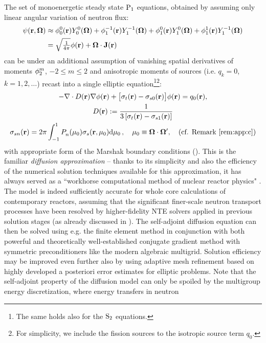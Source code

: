 The set of monoenergetic steady state $\PN[1]$ equations, obtained by assuming only linear angular variation of neutron
flux:
$$
\begin{aligned}
	\psi(\br,\bomega) &\approx \angmom{0}{0}(\br)\Y{0}{0}(\bomega) + \angmom{1}{-1}(\br)\Y{1}{-1}(\bomega)
	+ \angmom{1}{0}(\br)\Y{1}{0}(\bomega) + \angmom{1}{1}(\br)\Y{1}{-1}(\bomega)\\
	&= \sqrt{\tfrac{1}{4\pi}}\phi(\br) + \bomega\cdot \bJ(\br)
\end{aligned}
$$
can be under an additional assumption of vanishing spatial derivatives of moments $\angmom{2}{m}$, $-2 \leq m \leq
2$ and anisotropic moments of sources (i.e. $q_{k} = 0$, $k = 1,2,\ldots$)  
recast into a single elliptic equation\footnote{The same holds also for the $\SN[2]$ equations.}\footnote{For
simplicity, we include the fission sources to the isotropic source term $q_0$.}:
$$
\begin{gathered}
	-\nabla\cdot D(\br) \nabla\phi(\br) + \bigl[\sigma_t(\br) - \sigma_{s0}(\br)\bigr]\phi(\br) = q_0(\br),\\
	D(\br) := \frac{1}{3\left[\sigma_t(\br) - \sigma_{s1}(\br)\right]}\\
	\sigma_{sn}(\br) = 2\pi \muint[_0]{\P{n}{}(\mu_0)\sigma_s(\br,\mu_0)},\quad \mu_0 \equiv \bomega\cdot\bomega',\quad
	\mbox{(cf.
	Remark
	\ref{rem:app:c})}
\end{gathered}	
$$
with appropriate form of the Marshak boundary conditions (\cite{Stacey1,Reuss1}).
This is the familiar \textit{diffusion approximation} -- thanks to its simplicity and also the efficiency of the 
numerical solution techniques available for this approximation, it has always served as a ``workhorse computational 
method of nuclear reactor physics" \cite[p. 43]{Stacey1}. The model is indeed sufficiently accurate for whole core 
calculations of contemporary reactors, assuming that the significant finer-scale neutron transport processes have been 
resolved by higher-fidelity NTE solvers applied in previous solution stages (as already discussed in ).
The self-adjoint diffusion equation can then be solved using e.g. the finite element method in conjunction with both
powerful and theoretically well-established conjugate gradient method with symmetric preconditioners like the modern
algebraic multigrid. Solution efficiency may be improved even further also by using adaptive mesh refinement based on
highly developed a posteriori error estimates for elliptic problems. Note that the self-adjoint property of the
diffusion model can only be spoiled by the multigroup energy discretization, where energy transfers in neutron
